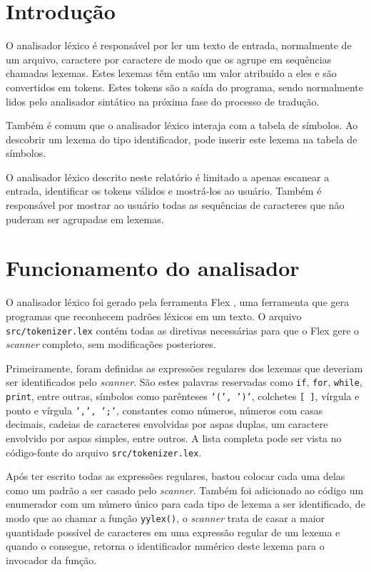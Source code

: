 \documentclass[
	article,			%
	11pt,				%
	oneside,			%
	a4paper,			%
	english,			%
	brazil,				%
	sumario=tradicional
	]{abntex2}
\begin{document}
\textual

\section{Introdução}

O analisador léxico é responsável por ler um texto de entrada,
normalmente de um arquivo, caractere por caractere de modo que
os agrupe em sequências chamadas lexemas. Estes lexemas têm
então um valor atribuído a eles e são convertidos em tokens. 
Estes tokens são a saída do programa, sendo normalmente lidos
pelo analisador sintático na próxima fase do processo de tradução.

Também é comum que o analisador léxico interaja com a tabela de
símbolos. Ao descobrir um lexema do tipo identificador, pode inserir
este lexema na tabela de símbolos.

O analisador léxico descrito neste relatório é limitado a apenas
escanear a entrada, identificar os tokens válidos e mostrá-los ao
usuário. Também é responsável por mostrar ao usuário todas as 
sequências de caracteres que não puderam ser agrupadas em lexemas. 

\section{Funcionamento do analisador}

O analisador léxico foi gerado pela ferramenta Flex
\cite{westes:flex}, uma ferramenta que gera programas que
reconhecem padrões léxicos em um texto. O arquivo
\texttt{src/tokenizer.lex} \cite{unb-translator-mikael} contém
todas as diretivas necessárias para que o Flex gere o \textit{scanner}
completo, sem modificações posteriores. 

Primeiramente, foram definidas as expressões regulares dos lexemas
que deveriam ser identificados pelo \textit{scanner}. São estes palavras
reservadas como \texttt{if}, \texttt{for}, \texttt{while},
\texttt{print}, entre outras, símbolos como parênteses
\texttt{'(', ')'}, colchetes \texttt{[ ]}, vírgula e ponto e
vírgula \texttt{',', ';'}, constantes como números, números com
casas decimais, cadeias de caracteres envolvidas por aspas duplas,
um caractere envolvido por aspas simples, entre outros. A lista
completa pode ser vista no código-fonte do arquivo
\texttt{src/tokenizer.lex}.

Após ter escrito todas as expressões regulares, bastou colocar
cada uma delas como um padrão a ser casado pelo \textit{scanner}.
Também foi adicionado ao código um enumerador com um número único
para cada tipo de lexema a ser identificado, de modo que ao chamar
a função \texttt{yylex()}, o \textit{scanner} trata de casar a maior
quantidade possível de caracteres em uma expressão regular de um
lexema e quando o consegue, retorna o identificador numérico deste
lexema para o invocador da função.
\end{document}
